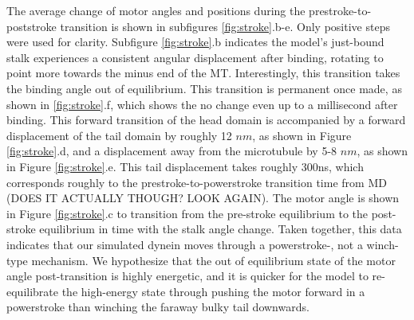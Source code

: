 \documentclass[9pt,twocolumn,twoside]{article}
\begin{document}
The average change of motor angles and positions during the prestroke-to-poststroke transition is shown in subfigures \ref{fig:stroke}.b-e. Only positive steps were used for clarity. Subfigure \ref{fig:stroke}.b indicates the model's just-bound stalk experiences a consistent angular displacement after binding, rotating to point more towards the minus end of the MT. Interestingly, this transition takes the binding angle out of equilibrium. This transition is permanent once made, as shown in \ref{fig:stroke}.f, which shows the no change even up to a millisecond after binding. This forward transition of the head domain is accompanied by a forward displacement of the tail domain by roughly 12 $nm$, as shown in Figure \ref{fig:stroke}.d, and a displacement away from the microtubule by 5-8 $nm$, as shown in Figure \ref{fig:stroke}.e. This tail displacement takes roughly 300ns, which corresponds roughly to the prestroke-to-powerstroke transition time from MD \cite{mdstroke} (DOES IT ACTUALLY THOUGH? LOOK AGAIN). The motor angle is shown in Figure \ref{fig:stroke}.c to transition from the pre-stroke equilibrium to the post-stroke equilibrium in time with the stalk angle change. Taken together, this data indicates that our simulated dynein moves through a powerstroke-, not a winch-type mechanism. We hypothesize that the out of equilibrium state of the motor angle post-transition is highly energetic, and it is quicker for the model to re-equilibrate the high-energy state through pushing the motor forward in a powerstroke than winching the faraway bulky tail downwards.

\end{document}
